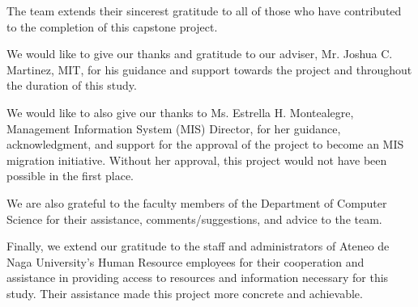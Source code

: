 \begin{acknowledgements}

The team extends their sincerest gratitude to all of those who have contributed to the completion of this capstone project.

We would like to give our thanks and gratitude to our adviser, Mr. Joshua C. Martinez, MIT, for his  guidance and support towards the project and throughout the duration of this study. 

We would like to also give our thanks to Ms. Estrella H. Montealegre, Management Information System (MIS) Director, for her  guidance, acknowledgment, and support for the approval of the project to become an MIS migration initiative. Without her approval, this project would not have been possible in the first place. 

We are also grateful to the faculty members of the Department of Computer Science for their assistance, comments/suggestions, and advice to the team.

Finally, we extend our gratitude to the staff and administrators of Ateneo de Naga University's Human Resource employees for their cooperation and assistance in providing access to resources and information necessary for this study. Their assistance made this project more concrete and achievable. 

\end{acknowledgements}
